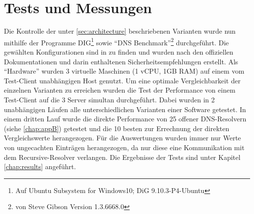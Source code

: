 \section{Tests und Messungen}
\label{sec:measurements}
Die Kontrolle der unter \ref{sec:architecture} beschriebenen Varianten wurde nun mithilfe der Programme DIG\footnote{Auf Ubuntu Subsystem for Windows10; DiG 9.10.3-P4-Ubuntu} sowie ``DNS Benchmark''\footnote{von Steve Gibson Version 1.3.6668.0} durchgeführt. Die gewählten Konfigurationen sind in  zu finden und wurden nach den offiziellen Dokumentationen und darin enthaltenen Sicherheitsempfehlungen erstellt. Als ``Hardware'' wurden 3 virtuelle Maschinen (1 vCPU, 1GB RAM) auf einem vom Test-Client unabhängigen Host genutzt. Um eine optimale Vergleichbarkeit der einzelnen Varianten zu erreichen wurden die Test der Performance von einem Test-Client auf die 3 Server simultan durchgeführt. Dabei wurden in 2 unabhängigen Läufen alle unterschiedlichen Varianten einer Software getestet. In einem dritten Lauf wurde die direkte Performance von 25 offener DNS-Resolvern (siehe \ref{chap:appB}) getestet und die 10 besten zur Errechnung der direkten Vergleichswerte herangezogen. Für die Auswertungen wurden immer nur Werte von ungecachten Einträgen herangezogen, da nur diese eine Kommunikation mit dem Recursive-Resolver verlangen. Die Ergebnisse der Tests sind unter Kapitel \ref{chap:results} angeführt. 

